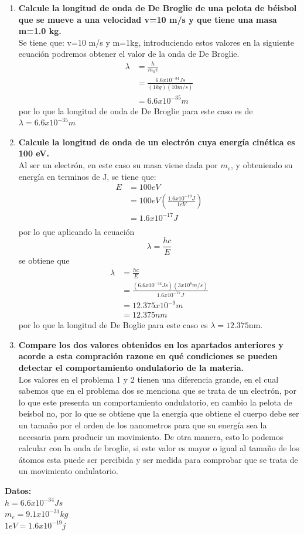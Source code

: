 \documentclass[12pt,letterpaper]{report}
\begin{document}
\begin{enumerate}
    \item \textbf{Calcule la longitud de onda de De Broglie de una pelota de béisbol que se mueve a una velocidad v=10 m/s y que tiene una masa m=1.0 kg.}\\
    Se tiene que: v=10 m/s y m=1kg, introduciendo estos valores en la siguiente ecuación podremos obtener el valor de la onda de De Broglie.\\
    \begin{align*}
        \lambda &= \frac{h}{m_0 v}\\ 
                &= \frac{6.6x10^{-34} Js}{(1 kg)(10 m/s)} \\
                &= 6.6x10^{-35} m 
    \end{align*}
    por lo que la longitud de onda de De Broglie para este caso es de $\lambda = 6.6x10^{-35}m $
    \item \textbf{Calcule la longitud de onda de un electrón cuya energía cinética es 100 eV.}\\
    Al ser un electrón, en este caso su masa viene dada por $m_e$, y obteniendo su energía en terminos de J, se tiene que:
    \begin{align*}
        E   &= 100eV \\
            &= 100eV \left(\frac{1.6x10^{-19}J}{1eV} \right) \\
            &= 1.6x10^{-17}J\\
    \end{align*}
    por lo que aplicando la ecuación
    \begin{equation*}
        \lambda = \frac{hc}{E}
    \end{equation*}
    se obtiene que 
    \begin{align*}
        \lambda &= \frac{hc}{E} \\
                &= \frac{(6.6x10^{-34}Js)(3x10^8 m/s)}{1.6x10^{-17}J }\\
                & =12.375x 10^{-9} m \\
                &= 12.375 nm
    \end{align*}
    por lo que la longitud de De Boglie para este caso es $\lambda= 12.375$nm.
    \item \textbf{Compare los dos valores obtenidos en los apartados anteriores y acorde a esta compración razone en qué condiciones se pueden detectar el comportamiento ondulatorio de la materia.}\\
    Los valores en el problema 1 y 2 tienen una diferencia grande, en el cual sabemos que en el problema dos se menciona que se trata de un electrón, por lo que este presenta un comportamiento ondulatorio, en cambio 
    la pelota de beísbol no, por lo que se obtiene que la energía que obtiene el cuerpo debe ser un tamaño por el orden de los nanometros para que su energía sea la necesaria para producir un movimiento. De otra manera, esto lo podemos calcular con la onda de broglie, 
    si este valor es mayor o igual al tamaño de los átomos esta puede ser percibida y ser medida para comprobar que se trata de un movimiento ondulatorio.
\end{enumerate}
\textbf{Datos:}\\
$h=6.6x10^{-34}Js$\\
$m_e=9.1x10^{-31}kg$\\
$1 eV=1.6x10^{-19}j$
\end{document}
